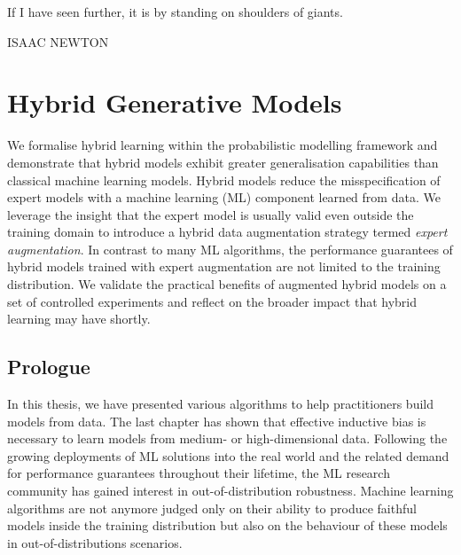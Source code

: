 \null\vfill
{\centering
\parbox{\textwidth}{%
  \raggedright
  {%

   If I have seen further, it is by standing on shoulders of giants.\par\bigskip
  }
  \raggedleft\MakeUppercase{Isaac Newton}\par%
}}

\vfill\vfill

\chapter{Hybrid Generative Models}\label{ch:07}

\begin{chapter_outline}

We formalise hybrid learning within the probabilistic modelling framework and demonstrate that hybrid models exhibit greater generalisation capabilities than classical machine learning models.
Hybrid models reduce the misspecification of expert models with a machine learning (ML) component learned from data. We leverage the insight that the expert model is usually valid even outside the training domain to introduce a hybrid data augmentation strategy termed \textit{expert augmentation}. In contrast to many ML algorithms, the performance guarantees of hybrid models trained with expert augmentation are not limited to the training distribution. We validate the practical benefits of augmented hybrid models on a set of controlled experiments and reflect on the broader impact that hybrid learning may have shortly.

\end{chapter_outline}

\section{Prologue}
In this thesis, we have presented various algorithms to help practitioners build models from data. The last chapter has shown that effective inductive bias is necessary to learn models from medium- or high-dimensional data. Following the growing deployments of ML solutions into the real world and the related demand for performance guarantees throughout their lifetime, the ML research community has gained interest in out-of-distribution robustness. Machine learning algorithms are not anymore judged only on their ability to produce faithful models inside the training distribution but also on the behaviour of these models in out-of-distributions scenarios.

